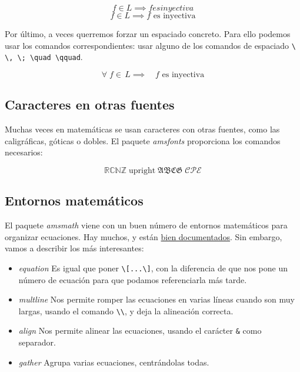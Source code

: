 \begin{LTXexample}[pos=r]
\[ f \in L \implies f es inyectiva \]
\[ f \in L \implies f \text{ es inyectiva} \]
\end{LTXexample}

Por último, a veces querremos forzar un espaciado concreto. Para ello podemos usar los comandos correspondientes: usar alguno de los comandos de espaciado \verb|\ \, \; \quad \qquad|.


\begin{LTXexample}[pos=r]
\[ \forall \; f \in\, L \implies \quad f \text{ es inyectiva} \]
\end{LTXexample}

\subsection{Caracteres en otras fuentes}

Muchas veces en matemáticas se usan caracteres con otras fuentes, como las caligráficas, góticas o dobles. El paquete \textit{amsfonts} proporciona los comandos necesarios:

\begin{LTXexample}[pos=r]
\[ \mathbb{RCNZ}\; \mathrm{upright}\; \mathfrak{ABCG}\; \mathcal{CPE} \]
\end{LTXexample}


\subsection{Entornos matemáticos}

El paquete \textit{amsmath} viene con un buen número de entornos matemáticos para organizar ecuaciones. Hay muchos, y están \href{ftp://ftp.ams.org/pub/tex/doc/amsmath/amsldoc.pdf}{bien documentados}. Sin embargo, vamos a describir los más interesantes:

\begin{itemize}
\item \textit{equation} Es igual que poner \verb|\[...\]|, con la diferencia de que nos pone un número de ecuación para que podamos referenciarla más tarde.
\item \textit{multline} Nos permite romper las ecuaciones en varias líneas cuando son muy largas, usando el comando \verb|\\|, y deja la alineación correcta.
\item \textit{align} Nos permite alinear las ecuaciones, usando el carácter \verb|&| como separador.
\item \textit{gather} Agrupa varias ecuaciones, centrándolas todas.
\end{itemize}

